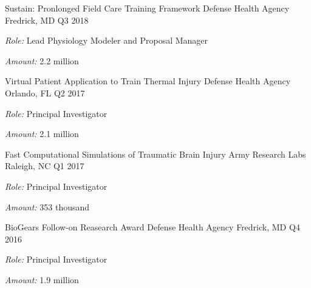 
\begin{cventries}

  \cventry
    {Sustain: Pronlonged Field Care Training Framework} %
    {Defense Health Agency} %
    {Fredrick, MD} %
    {Q3 2018} %
     {
     \begin{cvitems}
     \item{\textit{Role:} Lead Physiology Modeler and Proposal Manager}
     \item{\textit{Amount:} 2.2 million}
     \end{cvitems}
     }

  \cventry
    {Virtual Patient Application to Train Thermal Injury} %
    {Defense Health Agency} %
    {Orlando, FL} %
    {Q2 2017} %
     {
    \begin{cvitems}
     \item{\textit{Role:} Principal Investigator}
     \item{\textit{Amount:} 2.1 million}
    \end{cvitems}
     }

  \cventry
    {Fast Computational Simulations of Traumatic Brain Injury} %
    {Army Research Labs} %
    {Raleigh, NC} %
    {Q1 2017} %
     {
     \begin{cvitems}
     \item{\textit{Role:} Principal Investigator}
     \item{\textit{Amount:} 353 thousand}
     \end{cvitems}
     }

  \cventry
    {BioGears Follow-on Reasearch Award} %
    {Defense Health Agency} %
    {Fredrick, MD} %
    {Q4 2016} %
     {
     \begin{cvitems}
     \item{\textit{Role:} Principal Investigator}
     \item{\textit{Amount:} 1.9 million}
     \end{cvitems}
     }

\pagebreak

\end{cventries}
